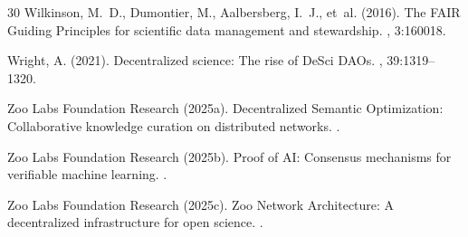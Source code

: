 \begin{thebibliography}{30}
Wilkinson, M.~D., Dumontier, M., Aalbersberg, I.~J., et~al. (2016).
\newblock The FAIR Guiding Principles for scientific data management and stewardship.
, 3:160018.

Wright, A. (2021).
\newblock Decentralized science: The rise of DeSci DAOs.
, 39:1319--1320.

Zoo Labs Foundation Research (2025a).
\newblock Decentralized Semantic Optimization: Collaborative knowledge curation on distributed networks.
.

Zoo Labs Foundation Research (2025b).
\newblock Proof of AI: Consensus mechanisms for verifiable machine learning.
.

Zoo Labs Foundation Research (2025c).
\newblock Zoo Network Architecture: A decentralized infrastructure for open science.
.

\end{thebibliography}

